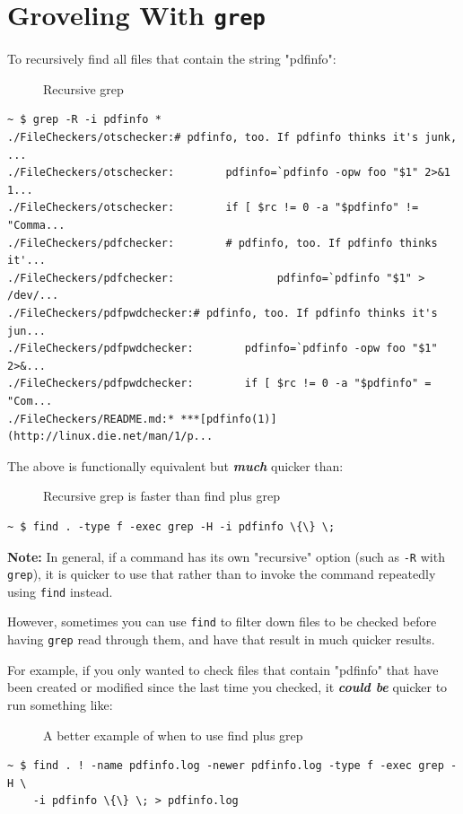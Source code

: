 \documentclass[10pt,]{book}
\numberwithin{figure}{chapter}
\DeclareRobustCommand{\drcap}[1]{\begin{figure}[H]\caption{#1}\end{figure}}
\DeclareRobustCommand{\drcmd}[1]{\index{Commands!#1}}
\begin{document}
\section{Groveling With \texttt{grep}}\label{groveling-with-grep}

To recursively find all files that contain the string "pdfinfo":

\drcap{Recursive grep}

\begin{verbatim}
~ $ grep -R -i pdfinfo *
./FileCheckers/otschecker:# pdfinfo, too. If pdfinfo thinks it's junk, ...
./FileCheckers/otschecker:        pdfinfo=`pdfinfo -opw foo "$1" 2>&1 1...
./FileCheckers/otschecker:        if [ $rc != 0 -a "$pdfinfo" != "Comma...
./FileCheckers/pdfchecker:        # pdfinfo, too. If pdfinfo thinks it'...
./FileCheckers/pdfchecker:                pdfinfo=`pdfinfo "$1" > /dev/...
./FileCheckers/pdfpwdchecker:# pdfinfo, too. If pdfinfo thinks it's jun...
./FileCheckers/pdfpwdchecker:        pdfinfo=`pdfinfo -opw foo "$1" 2>&...
./FileCheckers/pdfpwdchecker:        if [ $rc != 0 -a "$pdfinfo" = "Com...
./FileCheckers/README.md:* ***[pdfinfo(1)](http://linux.die.net/man/1/p...
\end{verbatim}

The above is functionally equivalent but \textbf{\emph{much}} quicker
than:

\drcap{Recursive grep is faster than find plus grep}

\begin{verbatim}
~ $ find . -type f -exec grep -H -i pdfinfo \{\} \; 
\end{verbatim}

\textbf{Note:} In general, if a command has its own "recursive" option
(such as \texttt{-R} with \texttt{grep}), it is quicker to use that
rather than to invoke the command repeatedly using
\texttt{find}\drcmd{find} instead.

However, sometimes you can use \texttt{find} to filter down files to be
checked before having \texttt{grep} read through them, and have that
result in much quicker results.

For example, if you only wanted to check files that contain "pdfinfo"
that have been created or modified since the last time you checked, it
\textbf{\emph{could be}} quicker to run something like:

\drcap{A better example of when to use find plus grep}

\begin{verbatim}
~ $ find . ! -name pdfinfo.log -newer pdfinfo.log -type f -exec grep -H \
    -i pdfinfo \{\} \; > pdfinfo.log
\end{verbatim}
\end{document}

